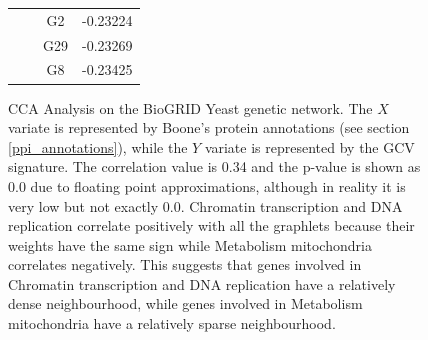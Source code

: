 \begin{figure}[H]
\begin{tabular}{ c c | c c }
 & &  G2 & -0.23224\\
 & &  G29 & -0.23269\\
 & &  G8 & -0.23425\\
\end{tabular}
\caption[CCA Analysis on the BioGRID Yeast genetic network -- Boone's annotations]{CCA Analysis on the BioGRID Yeast genetic network. The $X$ variate is represented by Boone's protein annotations (see section \ref{ppi_annotations}), while the $Y$ variate is represented by the GCV signature. The correlation value is 0.34 and the p-value is shown as 0.0 due to floating point approximations, although in reality it is very low but not exactly 0.0. Chromatin transcription and DNA replication correlate positively with all the graphlets because their weights have the same sign while Metabolism mitochondria correlates negatively. This suggests that genes involved in Chromatin transcription and DNA replication have a relatively dense neighbourhood, while genes involved in Metabolism mitochondria have a relatively sparse neighbourhood.}
\label{all_ppi7}
\end{figure}










